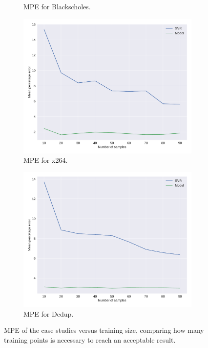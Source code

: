 \begin{figure}[H]
\begin{subfigure}[b]{0.45\textwidth}
		\caption{MPE for Blackscholes.}
		\label{fig:overhead_black}
	\end{subfigure}
	\par\bigskip
	\begin{subfigure}[b]{0.45\textwidth}
		\centerline{\includegraphics[width=\columnwidth]{models/figures/overhead/completo_x264_4.pdf}}
		\caption{MPE for x264.}
		\label{fig:overhead_x264}
	\end{subfigure}
	\begin{subfigure}[b]{0.45\textwidth}
		\centerline{\includegraphics[width=\columnwidth]{models/figures/overhead/completo_dedup_4.pdf}}
		\caption{MPE for Dedup.}
		\label{fig:overhead_dedup}
	\end{subfigure}
	
	\caption{MPE of the case studies versus training size, comparing how many training points is necessary to reach an acceptable result.}
	\label{fig:overheadapps}
\end{figure}

